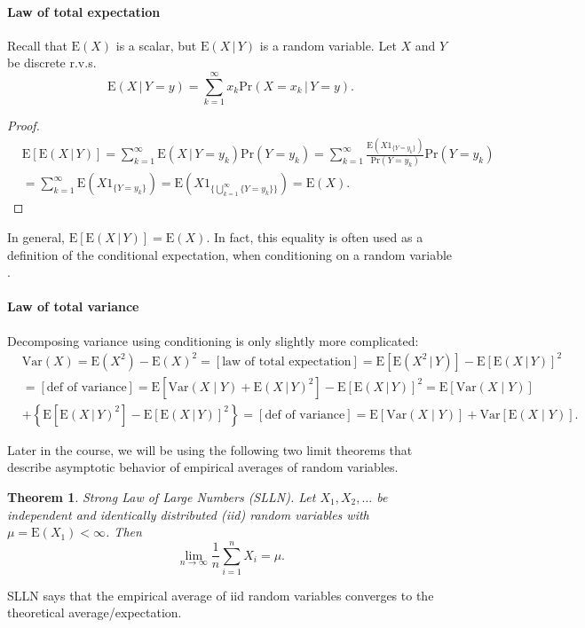 \documentclass[11pt]{article}\usepackage[]{graphicx}\usepackage[]{color}
\numberwithin{algorithm}{section}
\newcommand{\cprob}[2]{\ensuremath{\text{Pr}\left(#1 \,|\,#2\right)}}
\newcommand{\prob}[1]{\ensuremath{\text{Pr}\left(#1 \right)}}
\newcommand{\cexpect}[4]{\ensuremath{\text{E}\left#3 #1 \,|\,#2\right#4}}
\newcommand{\expect}[3]{\ensuremath{\text{E}\left#2 #1 \right#3}}
\newcommand{\indfun}[1]{\ensuremath{1_{\{#1\}}}}
\newtheorem*{theorem}{Theorem}
\theoremstyle{remark}
\theoremstyle{definition}
\begin{document}
\paragraph{Law of total expectation} Recall that $\expect{X}{(}{)}$ is a scalar, but 
$\cexpect{X}{Y}{(}{)}$ is a random variable. Let $X$ and $Y$ be discrete r.v.s. 
\[
\cexpect{X}{Y=y}{(}{)} = \sum_{k=1}^{\infty} x_k \cprob{X=x_k}{Y=y}.
\]
\begin{proof}
\[
\begin{split}
  &\expect{\cexpect{X}{Y}{(}{)}}{[}{]} = \sum_{k=1}^{\infty} \cexpect{X}{Y=y_k}{(}{)} \prob{Y=y_k} =
  \sum_{k=1}^{\infty} \frac{\expect{X \indfun{Y=y_k}}{(}{)}}{\prob{Y=y_k}} \prob{Y=y_k} \\
  &= \sum_{k=1}^{\infty} \expect{X \indfun{Y=y_k}}{(}{)} = 
  \expect{X \indfun{\bigcup_{k=1}^{\infty}\{Y=y_k\}}}{(}{)} = \expect{X}{(}{)}.
\end{split}
\]
\end{proof}
In general, $\expect{\cexpect{X}{Y}{(}{)}}{[}{]} = \expect{X}{(}{)}$. In fact, this equality is often
used as a definition of the conditional expectation, when conditioning on a random variable 
\citep{DurretProbBook}.

\paragraph{Law of total variance} 
Decomposing variance using conditioning is only slightly more complicated:
\[
\begin{split}
&\text{Var}(X) = \expect{X^2}{(}{)} - \expect{X}{(}{)}^2 = [\text{law of total expectation}]
= \expect{\cexpect{X^2}{Y}{(}{)}}{[}{]} - \expect{\cexpect{X}{Y}{(}{)}}{[}{]}^2\\
&=[\text{def of variance}] = \expect{\text{Var}(X \mid Y) + \cexpect{X}{Y}{(}{)}^2}{[}{]} 
- \expect{\cexpect{X}{Y}{(}{)}}{[}{]}^2 = \expect{\text{Var}(X \mid Y)}{[}{]}\\
&+ \left\{\expect{\cexpect{X}{Y}{(}{)}^2}{[}{]} - \expect{\cexpect{X}{Y}{(}{)}}{[}{]}^2\right\}
= [\text{def of variance}] = \text{E}\left[\text{Var}(X \mid Y)\right] + \text{Var}\left[\text{E}(X \mid Y)\right].
\end{split}
\]

Later in the course, we will be using the following two limit theorems that describe asymptotic behavior of empirical averages of random variables.

\begin{theorem}{Strong Law of Large Numbers (SLLN).}
Let $X_1, X_2, \dots$ be independent and identically distributed (iid) random variables
with $\mu = \text{E}(X_1) < \infty$. Then
\[
\lim_{n \rightarrow \infty} \frac{1}{n}\sum_{i=1}^n X_i = \mu.
\]
\end{theorem}
SLLN says that the empirical average of iid random variables converges to the theoretical average/expectation.
\end{document}
